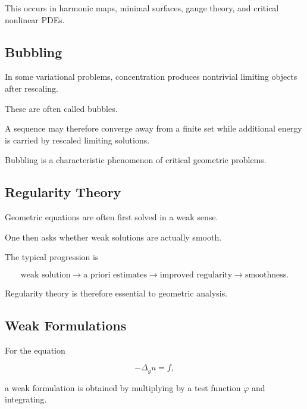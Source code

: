 This occurs in harmonic maps, minimal surfaces, gauge theory, and
critical nonlinear PDEs.

\subsection{Bubbling}
\label{subsec:geometric-bubbling}

In some variational problems, concentration produces nontrivial limiting
objects after rescaling.

These are often called bubbles.

A sequence may therefore converge away from a finite set while additional
energy is carried by rescaled limiting solutions.

Bubbling is a characteristic phenomenon of critical geometric problems.

\subsection{Regularity Theory}
\label{subsec:geometric-regularity}

Geometric equations are often first solved in a weak sense.

One then asks whether weak solutions are actually smooth.

The typical progression is

\[
\boxed{
\text{weak solution}
\longrightarrow
\text{a priori estimates}
\longrightarrow
\text{improved regularity}
\longrightarrow
\text{smoothness}.
}
\]

Regularity theory is therefore essential to geometric analysis.

\subsection{Weak Formulations}
\label{subsec:geometric-weak-formulations}

For the equation

\[
-\Delta_g u=f,
\]

a weak formulation is obtained by multiplying by a test function
\(\varphi\) and integrating.

